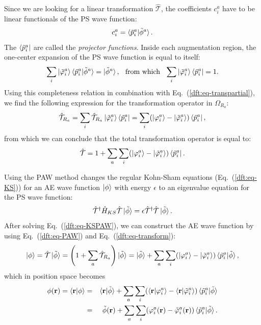 \begin{refsection}
Since we are looking for a linear transformation $\hat{\mathcal{T}}$, the 
coefficients $c_i^a$ have to be linear functionals of the \gls{PS} wave function: 
\begin{equation} 
c_i^a = \braket{\tilde{p}_i^a | \tilde{\phi}^a}. 
\end{equation} 
The $\bra{\tilde{p}_i^a}$ are called the \textit{projector functions}. Inside 
each augmentation region, the one-center expansion of the \gls{PS} wave function is 
equal to itself: 
\begin{equation} 
\sum_i \ket{\tilde{\varphi}_i^a}\braket{\tilde{p}_i^a | \tilde{\phi}^a} = 
\ket{\tilde{\phi}^a},\hspace{0.1in}\text{from which} \hspace{0.1in} \sum_i 
\ket{\tilde{\varphi}_i^a}\bra{\tilde{p}_i^a} = 1.  
\end{equation} 
Using this completeness relation in combination with 
Eq.~(\ref{dft:eq-transpartial}), we find the following expression for the 
transformation operator in $\Omega_{R_a}$: 
\begin{equation} 
\hat{\mathcal{T}}_{R_a} = \sum_i \hat{\mathcal{T}}_{R_a} 
\ket{\tilde{\varphi}_i^a}\bra{\tilde{p}_i^a} = \sum_i(\ket{\varphi_i^a} - 
\ket{\tilde{\varphi}_i^a})\bra{\tilde{p}_i^a}, 
\end{equation} 
from which we can conclude that the total transformation operator is equal to: 
\begin{equation}\label{dft:eq-transform} 
\hat{\mathcal{T}} = 1 + \sum_a \sum_i(\ket{\varphi_i^a} - 
\ket{\tilde{\varphi}_i^a})\bra{\tilde{p}_i^a}. 
\end{equation} 
 
Using the \gls{PAW} method changes the regular Kohn-Sham equations 
(Eq.~(\ref{dft:eq-KS})) for an \gls{AE} wave function $\ket{\phi}$ with energy 
$\epsilon$ to an eigenvalue equation for the \gls{PS} wave function: 
\begin{equation}\label{dft:eq-KSPAW} 
\hat{\mathcal{T}}^\dagger \hat{H}_{KS} \hat{\mathcal{T}} \ket{\tilde{\phi}} = 
\epsilon \hat{\mathcal{T}}^\dagger \hat{\mathcal{T}} \ket{\tilde{\phi}}. 
\end{equation} 
After solving Eq.~(\ref{dft:eq-KSPAW}), we can construct the \gls{AE} wave function by 
using Eq.~(\ref{dft:eq-PAW}) and Eq.~(\ref{dft:eq-transform}): 
\begin{equation} 
\ket{\phi} = \hat{\mathcal{T}} \ket{\tilde{\phi}} = \left(1 + \sum_a 
\hat{\mathcal{T}}_{R_a}\right) \ket{\tilde{\phi}}= \ket{\tilde{\phi}} + \sum_a 
\sum_i(\ket{\varphi_i^a} - \ket{\tilde{\varphi}_i^a})\braket{\tilde{p}_i^a | 
\tilde{\phi}}, 
\end{equation} 
which in position space becomes 
\begin{eqnarray} 
\phi(\mathbf{r}) = \braket{\mathbf{r} | \phi} &=& \braket{\mathbf{r} 
|\tilde{\phi}} + \sum_a \sum_i(\braket{\mathbf{r} | \varphi_i^a} - 
\braket{\mathbf{r} | \tilde{\varphi}_i^a})\braket{\tilde{p}_i^a | 
\tilde{\phi}} 
\\&=& \tilde{\phi}(\mathbf{r}) + \sum_a \sum_i(\varphi_i^a(\mathbf{r}) - 
\tilde{\varphi}_i^a (\mathbf{r}))\braket{\tilde{p}_i^a | \tilde{\phi}}. 
\end{eqnarray} 
 

\end{refsection}
